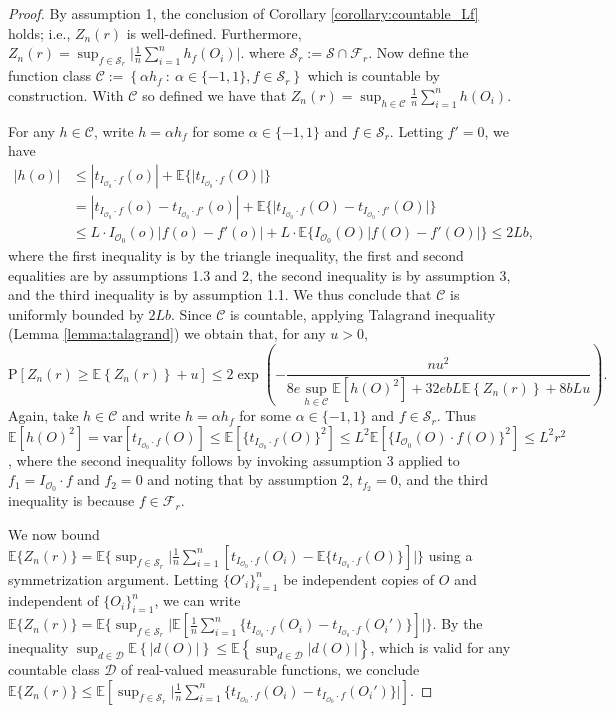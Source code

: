 \documentclass[twoside,11pt]{article}
\newcommand{\E}{\mathbb{E}}
\newcommand{\mc}{\mathcal}
\begin{document}
\begin{proof} By assumption 1, the conclusion of Corollary \ref{corollary:countable_Lf} holds; i.e., $Z_n(r)$ is well-defined. Furthermore, $ Z_n(r)=\sup_{f\in \mc{S}_r} \big\vert\frac{1}{n}\sum_{i=1}^nh_f(O_i) \big\vert$.
where $\mc{S}_r := \mc{S} \cap \mc{F}_r$.
Now define the function class $\mc{C}:=\left\{\alpha h_f\::\:\alpha\in\{-1,1\}, f\in\mc{S}_r\right\}$ which is countable by construction. With $\mc{C}$ so defined we have that $ Z_n(r)=\sup_{h\in\mc{C}}\frac{1}{n}\sum_{i=1}^nh(O_i)$.

For any $h\in\mc{C}$, write $h=\alpha h_f$ for some $\alpha\in\{-1,1\}$ and $f\in\mc{S}_r$. Letting $f'=0$, we have
\begin{align*}
    |h(o)|&\le |t_{I_{\mc{O}_0}\cdot f}(o)|+\E\big\{\big\vert t_{I_{\mc{O}_0}\cdot f}(O)\big\vert\big\}\\
    &=|t_{I_{\mc{O}_0}\cdot f}(o)-t_{I_{\mc{O}_0}\cdot f'}(o)|+\E\big\{\big\vert t_{I_{\mc{O}_0}\cdot f}(O)-t_{I_{\mc{O}_0}\cdot f'}(O)\big\vert\big\}\\
    &\le L\cdot I_{\mc{O}_0}(o)\big\vert f(o)-f'(o)\big\vert + L\cdot \E\big\{I_{\mc{O}_0}(O)\big\vert f(O)-f'(O)\big\vert \big\}\le 2Lb,
\end{align*}
where the first inequality is by the triangle inequality, the first and second equalities are by assumptions 1.3 and 2, the second inequality is by assumption 3, and the third inequality is by assumption 1.1. We thus conclude that $\mc{C}$ is uniformly bounded by $2Lb$. Since $\mc{C}$ is countable, applying Talagrand inequality (Lemma \ref{lemma:talagrand}) we obtain that, for any $u>0$,
    \[
    \text{P}\left[Z_n(r)\ge \mathbb{E}\left\{Z_n(r)\right\}+u\right]\le 2\exp\left(-\frac{nu^2}{8e\sup_{h\in\mc{C}}\mathbb{E}[h(O)^2]+32ebL\mathbb{E}\left\{Z_n(r)\right\}+8bLu}\right).
    \]
    Again, take $h\in\mc{C}$ and write $h=\alpha h_f$ for some $\alpha\in\{-1,1\}$ and $f\in\mc{S}_r$. Thus $\mathbb{E}[h(O)^2]=\text{var}[t_{I_{\mc{O}_0}\cdot f}(O)]\le \mathbb{E}[\{ t_{I_{\mc{O}_0}\cdot f}(O)\}^2]\le L^2\E[\{I_{\mc{O}_0}(O)\cdot f(O)\}^2]\le L^2r^2$, where the second inequality follows by invoking assumption 3 applied to $f_1=I_{\mc{O}_0}\cdot f$ and $f_2=0$ and noting that by assumption 2, $t_{f_2}=0$, and the third inequality is because $f\in\mc{F}_r$.

   We now bound $\E\{Z_n(r)\}=\E\{\sup_{f\in\mc{S}_r}\vert\frac{1}{n}\sum_{i=1}^n[t_{I_{\mc{O}_0}\cdot f}(O_i)-\E\{t_{I_{\mc{O}_0}\cdot f}(O)\}]\vert\}$ using a symmetrization argument. Letting $\{O'_i\}_{i=1}^n$ be independent copies of $O$ and independent of $\{O_i\}_{i=1}^n$, we can write $\E\{Z_n(r)\}=\E\{\sup_{f\in\mc{S}_r}\vert\E[\frac{1}{n}\sum_{i=1}^n\{t_{I_{\mc{O}_0}\cdot f}(O_i)-t_{I_{\mc{O}_0}\cdot f}(O_i')\}]\vert\}$. By the inequality $\sup_{d\in\mc{D}}\E\left\{|d(O)|\right\}\le\E\left\{\sup_{d\in\mc{D}}|d(O)|\right\}$, which is valid for any countable class $\mc{D}$ of real-valued measurable functions, we conclude $\E\{Z_n(r)\}\le\E[\sup_{f\in\mc{S}_r}\vert\frac{1}{n}\sum_{i=1}^n\{t_{I_{\mc{O}_0}\cdot f}(O_i)-t_{I_{\mc{O}_0}\cdot f}(O_i')\}\vert]$.


\end{proof}
\end{document}
